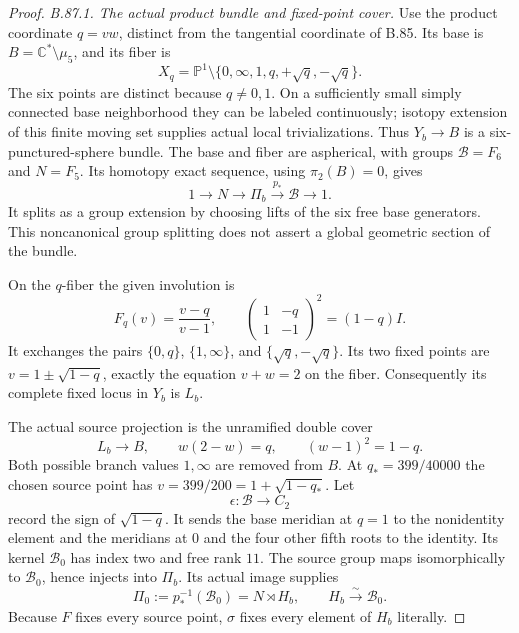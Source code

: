 \begin{proof}
\emph{B.87.1. The actual product bundle and fixed-point cover.}
Use the product coordinate $q=vw$, distinct from the tangential coordinate
of B.85. Its base is $B=\mathbb C^*\setminus\mu _5$, and its fiber is
\[
 X_q=\mathbb P^1\setminus
              \{0,\infty,1,q,+\sqrt q,-\sqrt q\}.
\]
The six points are distinct because $q\ne0,1$. On a sufficiently small
simply connected base neighborhood they can be labeled continuously;
isotopy extension of this finite moving set supplies actual local
trivializations. Thus $Y_b\to B$ is a six-punctured-sphere bundle.
The base and fiber are aspherical, with groups $\mathcal B=F_6$ and
$N=F_5$. Its homotopy exact sequence, using $\pi _2(B)=0$, gives
\begin{equation}\label{eq:B87-extension}
 1\longrightarrow N\longrightarrow\Pi_b
       \xrightarrow{p_*}\mathcal B\longrightarrow1.
\end{equation}
It splits as a group extension by choosing lifts of the six free base
generators. This noncanonical group splitting does not assert a global
geometric section of the bundle.

On the $q$-fiber the given involution is
\[
 F_q(v)=\frac{v-q}{v-1},\qquad
 \begin{pmatrix}1&-q\\1&-1\end{pmatrix}^{\!2}=(1-q)I.
\]
It exchanges the pairs $\{0,q\}$, $\{1,\infty\}$, and
$\{\sqrt q,-\sqrt q\}$. Its two fixed points are
$v=1\pm\sqrt{1-q}$, exactly the equation $v+w=2$ on the fiber.
Consequently its complete fixed locus in $Y_b$ is $L_b$.

The actual source projection is the unramified double cover
\[
 L_b\longrightarrow B,\qquad w(2-w)=q,
                    \qquad (w-1)^2=1-q.
\]
Both possible branch values $1,\infty$ are removed from $B$.
At $q_*=399/40000$ the chosen source point has
$v=399/200=1+\sqrt{1-q_*}$. Let
\[
 \epsilon:\mathcal B\longrightarrow C_2
\]
record the sign of $\sqrt{1-q}$. It sends the base meridian at $q=1$
to the nonidentity element and the meridians at $0$ and the four other
fifth roots to the identity. Its kernel $\mathcal B_0$ has index two
and free rank $11$. The source group maps isomorphically to
$\mathcal B_0$, hence injects into $\Pi_b$. Its actual image supplies
\begin{equation}\label{eq:B87-source-split}
 \Pi_0:=p_*^{-1}(\mathcal B_0)=N\rtimes H_b,
               \qquad H_b\xrightarrow{\sim}\mathcal B_0.
\end{equation}
Because $F$ fixes every source point, $\sigma$ fixes every element of
$H_b$ literally.


\end{proof}
